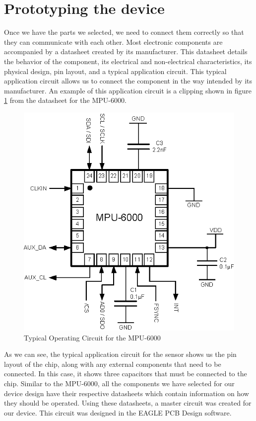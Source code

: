 \section{Prototyping the device}
\label{Chap:Prototype}
Once we have the parts we selected,
we need to connect them correctly so that they can communicate with each other.
Most electronic components are accompanied by a datasheet created by its manufacturer.
This datasheet details the behavior of the component,
its electrical and non-electrical characteristics,
its physical design,
pin layout,
and a typical application circuit.
This typical application circuit allows us to connect the component in the way intended by its manufacturer.
An example of this application circuit is a clipping shown in figure \ref{Fig:MPUAppCircuit} from the datasheet \cite{Datasheet:MPU6000} for the MPU-6000.
\begin{figure}
\begin{center}
\includegraphics{images/MPU600OpCircuit.eps}
\caption{Typical Operating Circuit for the MPU-6000}
\label{Fig:MPUAppCircuit}
\end{center}
\end{figure}
As we can see,
the typical application circuit for the sensor shows us the pin layout of the chip,
along with any external components that need to be connected.
In this case, it shows three capacitors that must be connected to the chip.
Similar to the MPU-6000,
all the components we have selected for our device design have their respective datasheets which contain information on how they should be operated.
Using these datasheets,
a master circuit was created for our device.
This circuit was designed in the EAGLE PCB Design software.

